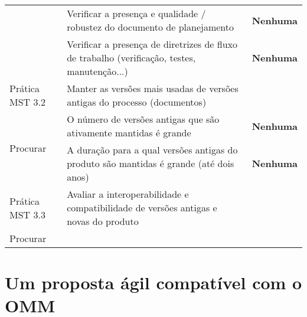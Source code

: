 \begin{longtable}{|p{2cm}|p{7cm}|p{7cm}|}
    \cline{2-3} & Verificar a presença e qualidade / robustez do
    documento de planejamento &\textbf{Nenhuma} \\
    \cline{2-3} & Verificar a presença de diretrizes de fluxo de
    trabalho (verificação, testes, manutenção...) &\textbf{Nenhuma} \\
    \hline \cellcolor[gray]{0.9} Prática MST 3.2 &
    \cellcolor[gray]{0.9} Manter as versões mais usadas de versões
    antigas do processo (documentos) & \\
    \hline \multirow{2}{*}{Procurar} & O número de versões antigas que
    são ativamente mantidas é grande & \textbf{Nenhuma} \\
    \cline{2-3} & A duração para a qual versões antigas do produto são
    mantidas é grande (até dois anos) &\textbf{Nenhuma} \\
    \hline \cellcolor[gray]{0.9} Prática MST 3.3 &
    \cellcolor[gray]{0.9} Avaliar a interoperabilidade e
    compatibilidade de versões antigas e novas do produto & \\
    \hline \multirow{1}{*}{Procurar} & & \\
    \hline
  \end{longtable}

\section{Um proposta ágil compatível com o OMM}
\label{sec:openagile-em-omm}

